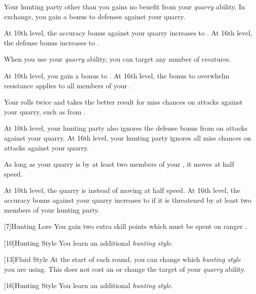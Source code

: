 {            
            Your hunting party other than you gains no benefit from your \textit{quarry} ability.
            In exchange, you gain a  bonus to defenses against your quarry.
            \par At 10th level, the accuracy bonus against your quarry increases to .
            At 16th level, the defense bonus increases to .

            When you use your \textit{quarry} ability, you can target any number of creatures.
            \par At 10th level, you gain a  bonus to .
            At 16th level, the bonus to overwhelm resistance applies to all members of your .

            Your  rolls twice and takes the better result for miss chances on attacks against your quarry, such as from .
            \par At 10th level, your hunting party also ignores the defense bonus from  on attacks against your quarry.
            At 16th level, your hunting party ignores all miss chances on attacks against your quarry.

            As long as your quarry is  by at least two members of your , it moves at half speed.
            \par At 10th level, the quarry is \immobilized instead of moving at half speed.
            At 16th level, the accuracy bonus against your quarry increases to  if it is threatened by at least two members of your hunting party.
        }

        [7]{Hunting Lore} You gain two extra skill points which must be spent on ranger .

        [10]{Hunting Style}
        You learn an additional \textit{hunting style}.

        [13]{Fluid Style}
        At the start of each round, you can change which \textit{hunting style} you are using.
        This does not cost an  or change the target of your \textit{quarry} ability.

        [16]{Hunting Style}
        You learn an additional \textit{hunting style}.

